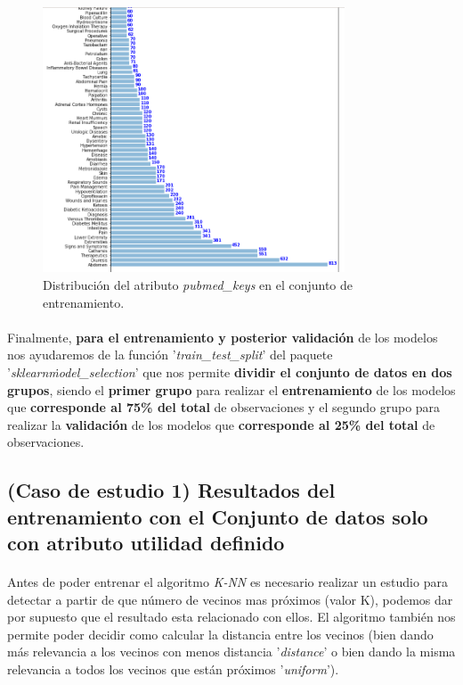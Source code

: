 \begin{figure}[!htb]
  \centering
    \includegraphics[width=0.8\textwidth]{images/resultados_knn_keywords.png}
    \caption{Distribución del atributo \textit{pubmed\_keys} en el conjunto de entrenamiento.}
  \label{knnDistKeywords}
\end{figure}

\paragraph{}
Finalmente, \textbf{para el entrenamiento y posterior validación} de los modelos nos ayudaremos de la función '\textit{train\_test\_split}'\cite{ref:knn_train_test_split} del paquete '\textit{sklearn\.model\_selection}' que nos permite \textbf{dividir el conjunto de datos en dos grupos}, siendo el \textbf{primer grupo} para realizar el \textbf{entrenamiento} de los modelos que \textbf{corresponde al 75\% del total} de observaciones y el segundo grupo para realizar la \textbf{validación} de los modelos que \textbf{corresponde al 25\% del total} de observaciones.

\subsection{(Caso de estudio 1) Resultados del entrenamiento con el Conjunto de datos solo con atributo utilidad definido}

\paragraph{}
Antes de poder entrenar el algoritmo \textit{K-NN} es necesario realizar un estudio para detectar a partir de que número de vecinos mas próximos (valor K), podemos dar por supuesto que el resultado esta relacionado con ellos. El algoritmo también nos permite poder decidir como calcular la distancia entre los vecinos (bien dando más relevancia a los vecinos con menos distancia '\textit{distance}'\cite{ref:knn_doc} o bien dando la misma relevancia a todos los vecinos que están próximos '\textit{uniform}'\cite{ref:knn_doc}).

